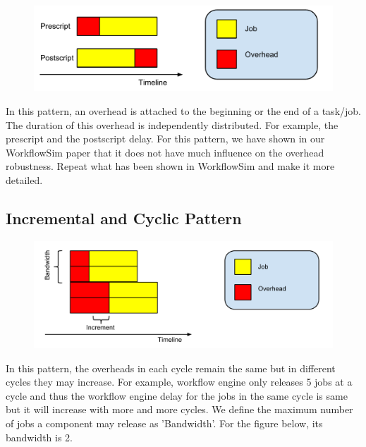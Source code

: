 \documentclass[final]{IEEEtran}
\begin{document}
\begin{figure}[htb]
\centering
 \includegraphics[width=1\linewidth]{figure/adherence.pdf}
  \label{fig:adhere}
  \vspace{-10pt}
\end{figure}


In this pattern, an overhead is attached to the beginning or the end of a task/job. The duration of this overhead is independently distributed. For example, the prescript and the postscript delay. For this pattern, we have shown in our WorkflowSim paper that it does not have much influence on the overhead robustness. Repeat what has been shown in WorkflowSim and make it more detailed. 



\subsection{Incremental and Cyclic Pattern}

\begin{figure}[htb]
\centering
 \includegraphics[width=1\linewidth]{figure/incremental.pdf}
  \label{fig:adhere}
  \vspace{-10pt}
\end{figure}

In this pattern, the overheads in each cycle remain the same but in different cycles they may increase. For example, workflow engine only releases 5 jobs at a cycle and thus the workflow engine delay for the jobs in the same cycle is same but it will increase with more and more cycles. We define the maximum number of jobs a component may release as 'Bandwidth'. For the figure below, its bandwidth is 2. 
\end{document}
